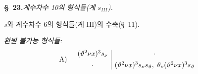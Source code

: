 
\begin{center}
\textbf{\S\ 23.}\quad\emph{계수차수 10의 형식들(계 $s_{III}$).}
\end{center}

$s$와 계수차수 6의 형식들(계 III)의 수축(\S\ 11).

\noindent\emph{환원 불가능 형식들:}
\[
\begin{array}{r@{\quad}c}
\text{A)}&
\begin{array}{c|c}
(\vartheta^2\nu x)^3s_\nu&\cdot\\[0.45em]
\cdot&(\vartheta^2\nu x)^3s_\nu s_\vartheta,\ \theta_\nu(\vartheta^2\nu x)^3s_\vartheta
\end{array}
\end{array}
\]
